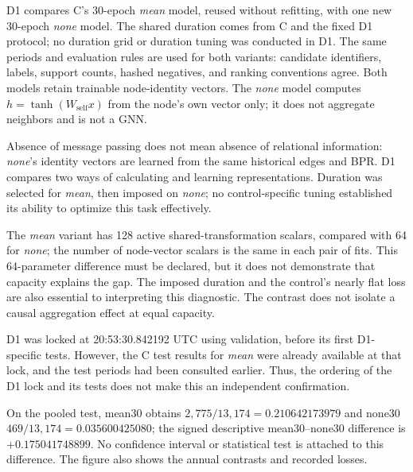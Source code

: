 D1 compares C's 30-epoch \emph{mean} model, reused without refitting, with one new 30-epoch \emph{none} model. The shared duration comes from C and the fixed D1 protocol; no duration grid or duration tuning was conducted in D1. The same periods and evaluation rules are used for both variants: candidate identifiers, labels, support counts, hashed negatives, and ranking conventions agree. Both models retain trainable node-identity vectors. The \emph{none} model computes $h=\tanh(W_{\mathrm{self}}x)$ from the node's own vector only; it does not aggregate neighbors and is not a GNN.

Absence of message passing does not mean absence of relational information: \emph{none}'s identity vectors are learned from the same historical edges and BPR. D1 compares two ways of calculating and learning representations. Duration was selected for \emph{mean}, then imposed on \emph{none}; no control-specific tuning established its ability to optimize this task effectively.

The \emph{mean} variant has 128 active shared-transformation scalars, compared with 64 for \emph{none}; the number of node-vector scalars is the same in each pair of fits. This 64-parameter difference must be declared, but it does not demonstrate that capacity explains the gap. The imposed duration and the control's nearly flat loss are also essential to interpreting this diagnostic. The contrast does not isolate a causal aggregation effect at equal capacity.

D1 was locked at 20:53:30.842192 UTC using validation, before its first D1-specific tests. However, the C test results for \emph{mean} were already available at that lock, and the test periods had been consulted earlier. Thus, the ordering of the D1 lock and its tests does not make this an independent confirmation.

\begin{table}[!htbp]\centering\scriptsize\setlength{\tabcolsep}{2.5pt}
\caption{D1: micro recall@10 on cohorts with at least one positive link, at historical support $\geq1$. Mean30 is retained from C; none30 was newly fitted in D1. Hits are shown in parentheses. No interval is attached to the contrast.}
\label{tab:aggregation-rc2}

\end{table}

On the pooled test, mean30 obtains $2,775/13,174=0.210642173979$ and none30 $469/13,174=0.035600425080$; the signed descriptive mean30--none30 difference is $+0.175041748899$. No confidence interval or statistical test is attached to this difference. The figure also shows the annual contrasts and recorded losses.

